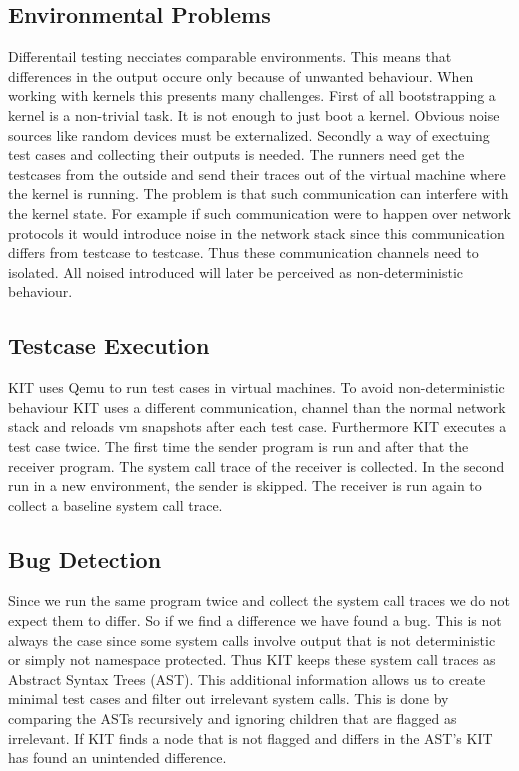\documentclass[10pt,twocolumn,a4paper]{article}
\begin{document}
\subsection{Environmental Problems}
Differentail testing necciates comparable environments. This means that differences in the output
occure only because of unwanted behaviour. When working with kernels this presents many challenges.
First of all bootstrapping a kernel is a non-trivial task. It is not enough to just boot a kernel. 
Obvious noise sources like random devices must be externalized.
Secondly a way of exectuing test cases and collecting their outputs is needed. 
The runners need get the testcases from the outside and send their traces out of the virtual machine
where the kernel is running.
The problem is that such communication can interfere with the kernel state. For example if such
communication were to happen over network protocols it would introduce noise in the network stack
since this communication differs from testcase to testcase. 
Thus these communication channels need to isolated. All noised introduced will later be perceived as
non-deterministic behaviour.

\subsection{Testcase Execution}
KIT uses Qemu to run test cases in virtual machines.
To avoid non-deterministic behaviour KIT uses a different communication, channel than the normal network stack and reloads vm snapshots after
each test case. Furthermore KIT  executes a test case twice.
The first time the sender program is run and after that the receiver program. 
The system call trace of the receiver is collected.
In the second run in a new environment, the sender is skipped. 
The receiver is run again to collect a baseline system call trace\cite{0}. 
\subsection{Bug Detection}
Since we run the same program twice and collect the system call traces we do not expect them to
differ. So if we find a difference we have found a bug. This is not always the case since some
system calls involve output that is not deterministic or simply not namespace protected.
Thus KIT keeps these system call traces as Abstract Syntax Trees (AST). This additional information allows 
us to create minimal test cases and filter out irrelevant system calls. 
This is done by comparing the ASTs recursively and ignoring children that are flagged as irrelevant. 
If KIT finds a node  that is not flagged and differs in the AST's KIT has found an unintended difference. 
\end{document}
